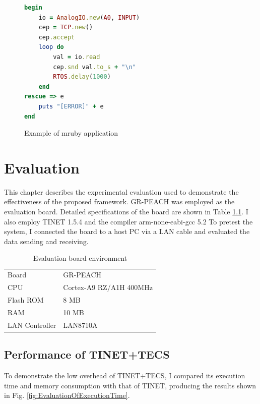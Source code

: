 \documentclass[a4j,12pt,oneside,openany,english]{jsbook}
\begin{document}
\begin{figure}[t]
\centering
\begin{lstlisting}[language=Ruby]
begin
    io = AnalogIO.new(A0, INPUT)
    cep = TCP.new()	
    cep.accept
    loop do		
        val = io.read  
        cep.snd val.to_s + "\n"		
        RTOS.delay(1000)			
    end
rescue => e	
    puts "[ERROR]" + e
end
\end{lstlisting}
\caption{Example of mruby application}
\label{src:mruby}
\end{figure}


\chapter{Evaluation}
\label{sec:Evaluation}

This chapter describes the experimental evaluation used to demonstrate the effectiveness of the proposed framework.
GR-PEACH was employed as the evaluation board.
Detailed specifications of the board are shown in Table \ref{tab:EvaluationBoardEnvironment}.
I also employ TINET 1.5.4 and the compiler arm-none-eabi-gcc 5.2
To pretest the system, I connected the board to a host PC via a LAN cable and evaluated the data sending and receiving.

\begin{table}[t]
    \centering
    \caption{Evaluation board environment}
    \begin{tabular}{l|l}
        \hline\hline
        Board           &   GR-PEACH                \\
        CPU             &   Cortex-A9 RZ/A1H 400MHz \\
        Flash ROM       &   8 MB                    \\
        RAM             &   10 MB                   \\
        LAN Controller  &   LAN8710A                \\
        \hline
    \end{tabular}
    \label{tab:EvaluationBoardEnvironment}
\end{table}

\section{Performance of TINET+TECS}

To demonstrate the low overhead of TINET+TECS, I compared its execution time and memory consumption with that of TINET, producing the results shown in Fig. \ref{fig:EvaluationOfExecutionTime}.
\end{document}
